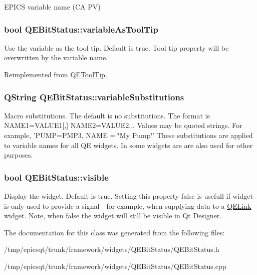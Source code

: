 \label{classQEBitStatus_a1025f61dcda8397905e8d46b7efdb577}
EPICS variable name (CA PV) \hypertarget{classQEBitStatus_abf44a21340aa190bdc1058802f9c8f87}{
\subsubsection[{variableAsToolTip}]{\setlength{\rightskip}{0pt plus 5cm}bool QEBitStatus::variableAsToolTip}}
\label{classQEBitStatus_abf44a21340aa190bdc1058802f9c8f87}
Use the variable as the tool tip. Default is true. Tool tip property will be overwritten by the variable name. 

Reimplemented from \hyperlink{classQEToolTip}{QEToolTip}.

\hypertarget{classQEBitStatus_af0acd3f853414840397c1694cd77442b}{
\subsubsection[{variableSubstitutions}]{\setlength{\rightskip}{0pt plus 5cm}QString QEBitStatus::variableSubstitutions}}
\label{classQEBitStatus_af0acd3f853414840397c1694cd77442b}
Macro substitutions. The default is no substitutions. The format is NAME1=VALUE1\mbox{[},\mbox{]} NAME2=VALUE2... Values may be quoted strings. For example, 'PUMP=PMP3, NAME = \char`\"{}My Pump\char`\"{}' These substitutions are applied to variable names for all QE widgets. In some widgets are are also used for other purposes. \hypertarget{classQEBitStatus_a1fe8291617d365852f3e43a81a728c0c}{
\subsubsection[{visible}]{\setlength{\rightskip}{0pt plus 5cm}bool QEBitStatus::visible}}
\label{classQEBitStatus_a1fe8291617d365852f3e43a81a728c0c}
Display the widget. Default is true. Setting this property false is usefull if widget is only used to provide a signal -\/ for example, when supplying data to a \hyperlink{classQELink}{QELink} widget. Note, when false the widget will still be visible in Qt Designer. 

The documentation for this class was generated from the following files:\begin{DoxyCompactItemize}
\item 
/tmp/epicsqt/trunk/framework/widgets/QEBitStatus/QEBitStatus.h\item 
/tmp/epicsqt/trunk/framework/widgets/QEBitStatus/QEBitStatus.cpp\end{DoxyCompactItemize}
